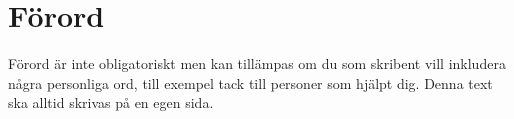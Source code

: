 \chapter{Förord}
\noindent
Förord är inte obligatoriskt men kan tillämpas om du som skribent vill 
inkludera några personliga ord, till exempel tack till personer som hjälpt dig.
Denna text ska alltid skrivas på en egen sida.
